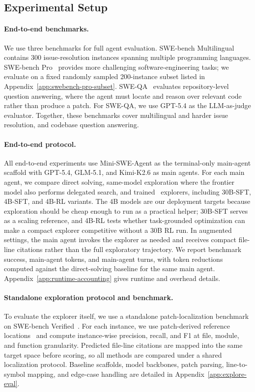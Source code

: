 \documentclass{llmxive}
\providecommand{\approach}{~}
\begin{document}
\subsection{Experimental Setup}
\label{sec:setup}

\paragraph{End-to-end benchmarks.}
We use three benchmarks for full agent evaluation.
SWE-bench Multilingual contains 300 issue-resolution instances spanning multiple programming languages.
SWE-bench Pro~\cite{swebenchpro} provides more challenging software-engineering tasks; we evaluate on a fixed randomly sampled 200-instance subset listed in Appendix~\ref{app:swebench-pro-subset}.
SWE-QA~\cite{sweqa} evaluates repository-level question answering, where the agent must locate and reason over relevant code rather than produce a patch.
For SWE-QA, we use GPT-5.4 as the LLM-as-judge evaluator.
Together, these benchmarks cover multilingual and harder issue resolution, and codebase question answering.

\paragraph{End-to-end protocol.}
All end-to-end experiments use Mini-SWE-Agent as the terminal-only main-agent scaffold with GPT-5.4, GLM-5.1, and Kimi-K2.6 as main agents.
For each main agent, we compare direct solving, same-model exploration where the frontier model also performs delegated search, and trained \approach explorers, including 30B-SFT, 4B-SFT, and 4B-RL variants.
The 4B models are our deployment targets because exploration should be cheap enough to run as a practical helper; 30B-SFT serves as a scaling reference, and 4B-RL tests whether task-grounded optimization can make a compact explorer competitive without a 30B RL run.
In augmented settings, the main agent invokes the explorer as needed and receives compact file-line citations rather than the full exploratory trajectory.
We report benchmark success, main-agent tokens, and main-agent turns, with token reductions computed against the direct-solving baseline for the same main agent.
Appendix~\ref{app:runtime-accounting} gives runtime and overhead details.

\vspace{-3mm}
\paragraph{Standalone exploration protocol and benchmark.}
To evaluate the explorer itself, we use a standalone patch-localization benchmark on SWE-bench Verified~\cite{swebench}.
For each instance, we use patch-derived reference locations~\cite{codescout} and compute instance-wise precision, recall, and F1 at file, module, and function granularity.
Predicted file-line citations are mapped into the same target space before scoring, so all methods are compared under a shared localization protocol.
Baseline scaffolds, model backbones, patch parsing, line-to-symbol mapping, and edge-case handling are detailed in Appendix~\ref{app:explore-eval}.
\end{document}
